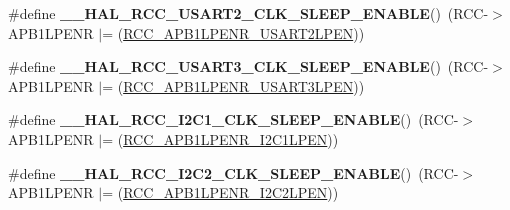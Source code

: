 \begin{DoxyCompactItemize}
\item 
\hypertarget{group___r_c_c___peripheral___clock___sleep___enable___disable_ga12132da4a7f5c62f32cd9d91b1c99495}{\#define {\bfseries \-\_\-\-\_\-\-H\-A\-L\-\_\-\-R\-C\-C\-\_\-\-U\-S\-A\-R\-T2\-\_\-\-C\-L\-K\-\_\-\-S\-L\-E\-E\-P\-\_\-\-E\-N\-A\-B\-L\-E}()~(R\-C\-C-\/$>$A\-P\-B1\-L\-P\-E\-N\-R $\vert$= (\hyperlink{group___peripheral___registers___bits___definition_ga6055c39af369463e14d6ff2017043671}{R\-C\-C\-\_\-\-A\-P\-B1\-L\-P\-E\-N\-R\-\_\-\-U\-S\-A\-R\-T2\-L\-P\-E\-N}))}\label{group___r_c_c___peripheral___clock___sleep___enable___disable_ga12132da4a7f5c62f32cd9d91b1c99495}

\item 
\hypertarget{group___r_c_c___peripheral___clock___sleep___enable___disable_ga2a18798b0e216c3ccc3caa76e741a689}{\#define {\bfseries \-\_\-\-\_\-\-H\-A\-L\-\_\-\-R\-C\-C\-\_\-\-U\-S\-A\-R\-T3\-\_\-\-C\-L\-K\-\_\-\-S\-L\-E\-E\-P\-\_\-\-E\-N\-A\-B\-L\-E}()~(R\-C\-C-\/$>$A\-P\-B1\-L\-P\-E\-N\-R $\vert$= (\hyperlink{group___peripheral___registers___bits___definition_gae11baa29f4e6d122dabdd54c6b4be052}{R\-C\-C\-\_\-\-A\-P\-B1\-L\-P\-E\-N\-R\-\_\-\-U\-S\-A\-R\-T3\-L\-P\-E\-N}))}\label{group___r_c_c___peripheral___clock___sleep___enable___disable_ga2a18798b0e216c3ccc3caa76e741a689}

\item 
\hypertarget{group___r_c_c___peripheral___clock___sleep___enable___disable_ga894dbeada170b01faef303d35de84917}{\#define {\bfseries \-\_\-\-\_\-\-H\-A\-L\-\_\-\-R\-C\-C\-\_\-\-I2\-C1\-\_\-\-C\-L\-K\-\_\-\-S\-L\-E\-E\-P\-\_\-\-E\-N\-A\-B\-L\-E}()~(R\-C\-C-\/$>$A\-P\-B1\-L\-P\-E\-N\-R $\vert$= (\hyperlink{group___peripheral___registers___bits___definition_ga33286469d0a9b9fedbc2b60aa6cd7da7}{R\-C\-C\-\_\-\-A\-P\-B1\-L\-P\-E\-N\-R\-\_\-\-I2\-C1\-L\-P\-E\-N}))}\label{group___r_c_c___peripheral___clock___sleep___enable___disable_ga894dbeada170b01faef303d35de84917}

\item 
\hypertarget{group___r_c_c___peripheral___clock___sleep___enable___disable_gac0167c77fa1c00add900bb1cf788e68c}{\#define {\bfseries \-\_\-\-\_\-\-H\-A\-L\-\_\-\-R\-C\-C\-\_\-\-I2\-C2\-\_\-\-C\-L\-K\-\_\-\-S\-L\-E\-E\-P\-\_\-\-E\-N\-A\-B\-L\-E}()~(R\-C\-C-\/$>$A\-P\-B1\-L\-P\-E\-N\-R $\vert$= (\hyperlink{group___peripheral___registers___bits___definition_gaf6a53d37df11a56412ae06f73626f637}{R\-C\-C\-\_\-\-A\-P\-B1\-L\-P\-E\-N\-R\-\_\-\-I2\-C2\-L\-P\-E\-N}))}\label{group___r_c_c___peripheral___clock___sleep___enable___disable_gac0167c77fa1c00add900bb1cf788e68c}


\end{DoxyCompactItemize}
